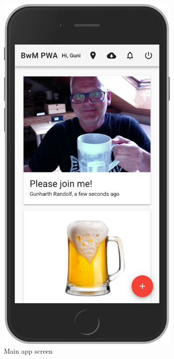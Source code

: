 \begin{figure}
  \begin{subfigure}{.5\textwidth}
    \centering
    \includegraphics[width=.7\linewidth]{img/screen02}
    \caption{Main app screen}
    \label{fig:sub2}
  \end{subfigure}
  \begin{subfigure}{.5\textwidth}
    \centering

\end{subfigure}
\end{figure}

